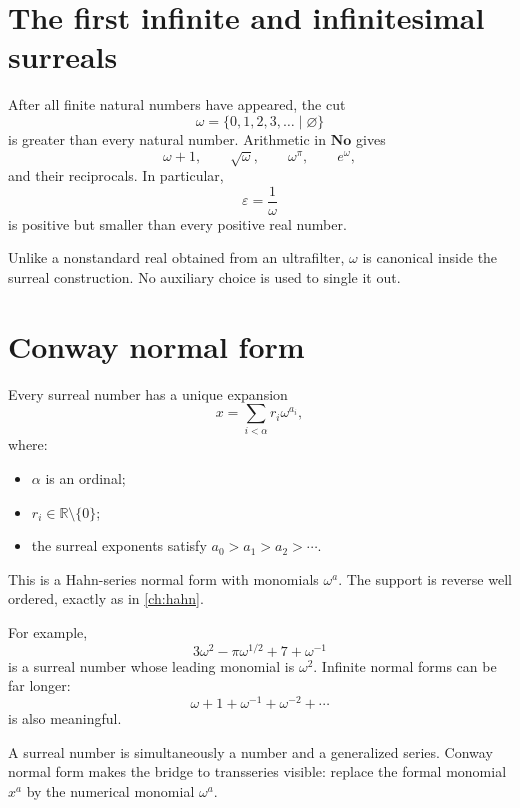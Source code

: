 \documentclass[11pt,openany]{book}
\theoremstyle{definition}
\theoremstyle{plain}
\theoremstyle{remark}
\newcommand{\R}{\mathbb{R}}
\begin{document}
\section{The first infinite and infinitesimal surreals}

After all finite natural numbers have appeared, the cut
\begin{equation}\label{eq:surreal-omega}
 \omega=\{0,1,2,3,\dots\mid\varnothing\}
\end{equation}
is greater than every natural number. Arithmetic in $\mathbf{No}$ gives
\[
 \omega+1,\qquad \sqrt\omega,\qquad
 \omega^\pi,\qquad e^\omega,
\]
and their reciprocals. In particular,
\[
 \varepsilon=\frac1\omega
\]
is positive but smaller than every positive real number.

Unlike a nonstandard real obtained from an ultrafilter, $\omega$ is canonical inside the surreal construction. No auxiliary choice is used to single it out.

\section{Conway normal form}

Every surreal number has a unique expansion
\begin{equation}\label{eq:conway-normal-form}
 x=\sum_{i<\alpha}r_i\omega^{a_i},
\end{equation}
where:
\begin{itemize}
 \item $\alpha$ is an ordinal;
 \item $r_i\in\R\setminus\{0\}$;
 \item the surreal exponents satisfy $a_0>a_1>a_2>\cdots$.
\end{itemize}
This is a Hahn-series normal form with monomials $\omega^a$. The support is reverse well ordered, exactly as in \cref{ch:hahn}.

For example,
\[
 3\omega^2-\pi\omega^{1/2}+7+\omega^{-1}
\]
is a surreal number whose leading monomial is $\omega^2$. Infinite normal forms can be far longer:
\[
 \omega+1+\omega^{-1}+\omega^{-2}+\cdots
\]
is also meaningful.

\begin{intuitionbox}
A surreal number is simultaneously a number and a generalized series. Conway normal form makes the bridge to transseries visible: replace the formal monomial $x^a$ by the numerical monomial $\omega^a$.
\end{intuitionbox}
\end{document}
